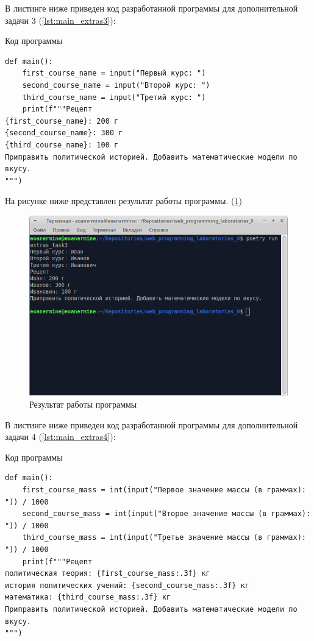 \documentclass[14pt]{extarticle}
\newenvironment{code}{\captionsetup{type=listing, belowskip=-14pt plus 3pt minus 0pt}}{}
\begin{document}
В листинге ниже приведен код разработанной программы для дополнительной задачи 3 (\ref{lst:main_extras3}):

\begin{code}    
\caption{Код программы\label{lst:main_extras3}}
\begin{verbatim}
def main():
	first_course_name = input("Первый курс: ")
	second_course_name = input("Второй курс: ")
	third_course_name = input("Третий курс: ")
	print(f"""Рецепт
{first_course_name}: 200 г
{second_course_name}: 300 г
{third_course_name}: 100 г
Приправить политической историей. Добавить математические модели по вкусу.
""")
\end{verbatim}
\end{code}

На рисунке ниже представлен результат работы программы. (\ref{img:main_extras3})

\begin{figure}[H]
    \centering
    \includegraphics[width=1.0\linewidth]{main_extras3.png}
    \caption{Результат работы программы\label{img:main_extras3}}
\end{figure}

В листинге ниже приведен код разработанной программы для дополнительной задачи 4 (\ref{lst:main_extras4}):

\begin{code}    
\caption{Код программы\label{lst:main_extras4}}
\begin{verbatim}
def main():
	first_course_mass = int(input("Первое значение массы (в граммах): ")) / 1000
	second_course_mass = int(input("Второе значение массы (в граммах): ")) / 1000
	third_course_mass = int(input("Третье значение массы (в граммах): ")) / 1000
	print(f"""Рецепт
политическая теория: {first_course_mass:.3f} кг
история политических учений: {second_course_mass:.3f} кг
математика: {third_course_mass:.3f} кг
Приправить политической историей. Добавить математические модели по вкусу.
""")
\end{verbatim}
\end{code}
\end{document}
